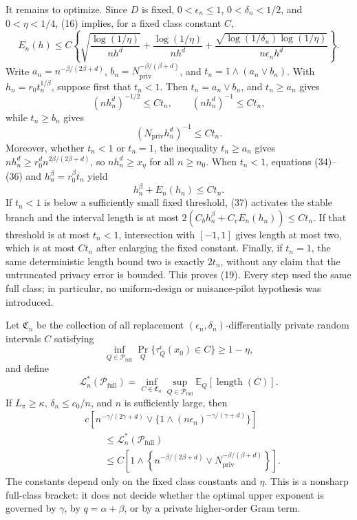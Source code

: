 It remains to optimize.  Since \(D\) is fixed, \(0<\epsilon_n\le1\), \(0<\delta_n<1/2\), and \(0<\eta<1/4\), (16) implies, for a fixed class constant \(C\),
\[
 E_n(h)\le C\left\{
 \sqrt{\frac{\log(1/\eta)}{nh^d}}
 +\frac{\log(1/\eta)}{nh^d}
 +\frac{\sqrt{\log(1/\delta_n)\log(1/\eta)}}
 {n\epsilon_nh^d}\right\}.
\tag{34}
\]
Write \(a_n=n^{-\beta/(2\beta+d)}\), \(b_n=N_{\mathrm{priv}}^{-\beta/(\beta+d)}\), and \(t_n=1\wedge(a_n\vee b_n)\).  With \(h_n=r_0t_n^{1/\beta}\), suppose first that \(t_n<1\).  Then \(t_n=a_n\vee b_n\), and \(t_n\ge a_n\) gives
\[
 (nh_n^d)^{-1/2}\le C t_n,
 \qquad (nh_n^d)^{-1}\le Ct_n,
\tag{35}
\]
while \(t_n\ge b_n\) gives
\[
 (N_{\mathrm{priv}}h_n^d)^{-1}\le Ct_n.
\tag{36}
\]
Moreover, whether \(t_n<1\) or \(t_n=1\), the inequality \(t_n\ge a_n\) gives \(nh_n^d\ge r_0^dn^{2\beta/(2\beta+d)}\), so \(nh_n^d\ge x_\eta\) for all \(n\ge n_0\).  When \(t_n<1\), equations (34)--(36) and \(h_n^\beta=r_0^\beta t_n\) yield
\[
 h_n^\beta+E_n(h_n)\le Ct_n.
\tag{37}
\]
If \(t_n<1\) is below a sufficiently small fixed threshold, (37) activates the stable branch and the interval length is at most \(2(C_bh_n^\beta+C_vE_n(h_n))\le Ct_n\).  If that threshold is at most \(t_n<1\), intersection with \([-1,1]\) gives length at most two, which is at most \(Ct_n\) after enlarging the fixed constant.  Finally, if \(t_n=1\), the same deterministic length bound two is exactly \(2t_n\), without any claim that the untruncated privacy error is bounded.  This proves (19).  Every step used the same full class; in particular, no uniform-design or nuisance-pilot hypothesis was introduced.

Let \(\mathfrak C_n\) be the collection of all replacement \((\epsilon_n,\delta_n)\)-differentially private random intervals \(C\) satisfying
\[
 \inf_{Q\in\mathcal P_{\mathrm{full}}}
 \Pr_Q\{\tau_Q^{\mathrm c}(x_0)\in C\}\ge1-\eta,
\]
and define
\[
 \mathcal L_n^*(\mathcal P_{\mathrm{full}})
 =\inf_{C\in\mathfrak C_n}\sup_{Q\in\mathcal P_{\mathrm{full}}}
 \mathbb E_Q[\operatorname{length}(C)].
\]
If \(L_\pi\ge\kappa\), \(\delta_n\le c_0/n\), and \(n\) is sufficiently large, then
\[
 \begin{aligned}
 &c\left[n^{-\gamma/(2\gamma+d)}
 \vee\{1\wedge(n\epsilon_n)^{-\gamma/(\gamma+d)}\}\right]\\
 &\qquad\le \mathcal L_n^*(\mathcal P_{\mathrm{full}})\\
 &\qquad\le C\left[1\wedge\left\{n^{-\beta/(2\beta+d)}
 \vee N_{\mathrm{priv}}^{-\beta/(\beta+d)}\right\}\right].
 \end{aligned}
\]
The constants depend only on the fixed class constants and \(\eta\).  This is a nonsharp full-class bracket: it does not decide whether the optimal upper exponent is governed by \(\gamma\), by \(q=\alpha+\beta\), or by a private higher-order Gram term.

